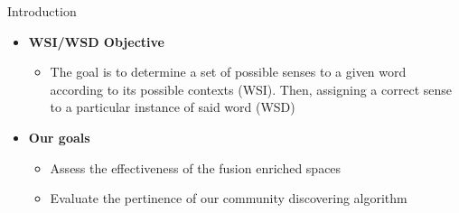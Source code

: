 \documentclass[10pt,=table]{beamer}
\begin{document}
\begin{frame}{Introduction}
\begin{itemize}
\item<1-> \large \textbf{WSI/WSD Objective}
\begin{itemize}
\item<1->  The goal is to determine a set of possible senses to a given word according to its possible contexts (WSI). Then, assigning a correct sense to a particular instance of said word (WSD)

\end{itemize}
\item<2-> \large \textbf{Our goals}
\begin{itemize}
\item<2-> Assess the effectiveness of the fusion enriched spaces
\item<2-> Evaluate the pertinence of our community discovering algorithm
\end{itemize}

\end{itemize}
\end{frame}
\end{document}
